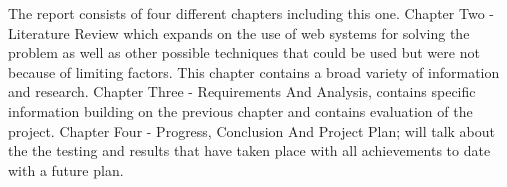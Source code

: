 \documentclass[../main.tex]{subfiles}
\begin{document}
\raggedright
The report consists of four different chapters including this one. Chapter Two - Literature Review which expands on the use of web systems for solving the problem as well as other possible techniques that could be used but were not because of limiting factors. This chapter contains a broad variety of information and research. Chapter Three - Requirements And Analysis, contains specific information building on the previous chapter and contains evaluation of the project. Chapter Four - Progress, Conclusion And Project Plan; will talk about the the testing and results that have taken place with all achievements to date with a future plan. 
\end{document}
